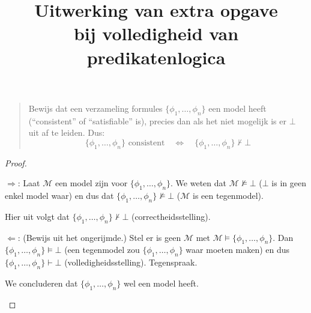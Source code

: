 \documentclass[a4paper,11pt]{article}
\title{Uitwerking van extra opgave\\
\normalsize{bij volledigheid van predikatenlogica}}
\date{}
\begin{document}
\maketitle


\begin{quote}
  Bewijs dat een verzameling formules $\{\phi_{1}, \ldots, \phi_{n}\}$ een model
  heeft (``consistent'' of ``satisfiable'' is), precies dan als het niet
  mogelijk is er $\bot$ uit af te leiden. Dus:
  \begin{equation*}
    \{\phi_{1}, \ldots, \phi_{n}\} \text{ consistent}
    \quad \Leftrightarrow \quad
    \{\phi_{1}, \ldots, \phi_{n}\} \not \vdash \bot
  \end{equation*}
\end{quote}

\begin{proof}

\begin{description}

\item{$\Rightarrow$:} Laat $\mathcal{M}$ een model zijn voor
$\{\phi_{1}, \ldots, \phi_{n}\}$. We weten dat $\mathcal{M} \not \models \bot$
($\bot$ is in geen enkel model waar) en dus dat
$\{\phi_{1}, \ldots, \phi_{n}\} \not \models \bot$ ($\mathcal{M}$ is een
tegenmodel).

Hier uit volgt dat
$\{\phi_{1}, \ldots, \phi_{n}\} \not \vdash \bot$ (correctheidsstelling).

\item{$\Leftarrow$:} (Bewijs uit het ongerijmde.) Stel er is geen $\mathcal{M}$
met $\mathcal{M} \models \{\phi_{1}, \ldots, \phi_{n}\}$. Dan
\mbox{$\{\phi_{1}, \ldots, \phi_{n}\} \models \bot$} (een tegenmodel zou
$\{\phi_{1}, \ldots, \phi_{n}\}$ waar moeten maken) en dus
$\{\phi_{1}, \ldots, \phi_{n}\} \vdash \bot$ (volledigheidsstelling).
Tegenspraak.

We concluderen dat $\{\phi_{1}, \ldots, \phi_{n}\}$ wel een model heeft.

\end{description}

\end{proof}
\end{document}
